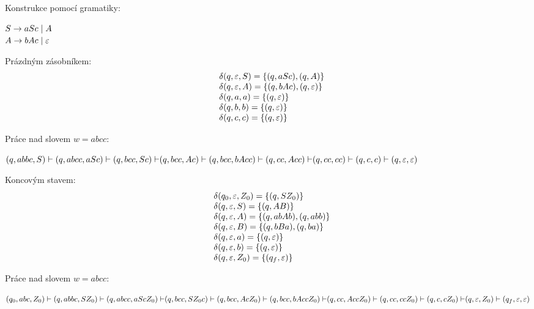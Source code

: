 Konstrukce pomocí gramatiky: 

$\medskip S \to aSc \mid A$\\
$\medskip A \to bAc \mid \varepsilon$

\begin{multicols}{2}
    
    Prázdným zásobníkem: 
    \[
    \begin{array}{l l}
        & \delta(q, \varepsilon, S) = \left\lbrace (q, aSc), (q, A) \right\rbrace \\
        & \delta(q, \varepsilon, A) = \left\lbrace (q, bAc), (q, \varepsilon) \right\rbrace \\
        & \delta(q, a, a) = \left\lbrace (q, \varepsilon) \right\rbrace \\
        & \delta(q, b, b) = \left\lbrace (q, \varepsilon) \right\rbrace \\ 
        & \delta(q, c, c) = \left\lbrace (q, \varepsilon) \right\rbrace \\ 
    \end{array}
    \]

    Práce nad slovem $w = abcc$:

    $
    {(q, abbc, S) \vdash (q, abcc, aSc) \vdash (q, bcc, Sc) \vdash}\\
    {(q, bcc, Ac) \vdash (q, bcc, bAcc) \vdash (q, cc, Acc) \vdash}\\ 
    {(q, cc, cc) \vdash (q, c, c) \vdash(q, \varepsilon, \varepsilon)}
    $

\columnbreak

    Koncovým stavem: 
    \[
    \begin{array}{l l}
        & \delta(q_0, \varepsilon, Z_0) = \left\lbrace (q, SZ_0) \right\rbrace \\
        & \delta(q, \varepsilon, S) = \left\lbrace (q, AB) \right\rbrace \\
        & \delta(q, \varepsilon, A) = \left\lbrace (q, abAb), (q, abb) \right\rbrace \\
        & \delta(q, \varepsilon, B) = \left\lbrace (q, bBa), (q, ba) \right\rbrace \\
        & \delta(q, \varepsilon, a) = \left\lbrace (q, \varepsilon) \right\rbrace \\
        & \delta(q, \varepsilon, b) = \left\lbrace (q, \varepsilon) \right\rbrace \\ 
        & \delta(q, \varepsilon, Z_0) = \left\lbrace (q_f, \varepsilon) \right\rbrace \\ 
    \end{array}
    \]

    Práce nad slovem $w = abcc$:

    $
    {(q_0, abc, Z_0) \vdash (q, abbc, SZ_0) \vdash (q, abcc, aScZ_0) \vdash}\\
    {(q, bcc, SZ_0c) \vdash (q, bcc, AcZ_0) \vdash (q, bcc, bAccZ_0) \vdash}\\
    {(q, cc, AccZ_0) \vdash ( q, cc, ccZ_0) \vdash (q, c, cZ_0) \vdash}\\
    (q, \varepsilon, Z_0) \vdash (q_f, \varepsilon, \varepsilon)
    $
\end{multicols}

